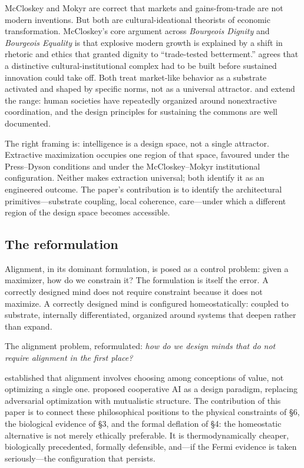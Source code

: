 \documentclass[11pt,twocolumn]{article}
\begin{document}
McCloskey and Mokyr are correct that markets and gains-from-trade are not
modern inventions. But both are cultural-ideational theorists of economic
transformation. McCloskey's core argument across \emph{Bourgeois Dignity}
\citep{McCloskey2010} and \emph{Bourgeois Equality} \citep{McCloskey2016}
is that explosive modern growth is explained by a shift in rhetoric and
ethics that granted dignity to ``trade-tested betterment.''
\citet{Mokyr2016} agrees that a distinctive cultural-institutional complex
had to be built before sustained innovation could take off. Both treat
market-like behavior as a substrate activated and shaped by specific
norms, not as a universal attractor. \citet{GraeberWengrow2021} and
\citet{Ostrom1990} extend the range: human societies have repeatedly
organized around nonextractive coordination, and the design principles
for sustaining the commons are well documented.

The right framing is: intelligence is a design space, not a single
attractor. Extractive maximization occupies one region of that space,
favoured under the Press--Dyson conditions and under the
McCloskey--Mokyr institutional configuration. Neither makes extraction
universal; both identify it as an engineered outcome. The paper's
contribution is to identify the architectural primitives—substrate
coupling, local coherence, care—under which a different region of the
design space becomes accessible.

\subsection{The reformulation}

Alignment, in its dominant formulation, is posed as a control problem:
given a maximizer, how do we constrain it? The formulation is itself the
error. A correctly designed mind does not require constraint because it
does not maximize. A correctly designed mind is configured homeostatically:
coupled to substrate, internally differentiated, organized around systems
that deepen rather than expand.

The alignment problem, reformulated: \emph{how do we design minds that do
not require alignment in the first place?}

\citet{Gabriel2020} established that alignment involves choosing among
conceptions of value, not optimizing a single one. \citet{Dafoe2021}
proposed cooperative AI as a design paradigm, replacing adversarial
optimization with mutualistic structure. The contribution of this paper
is to connect these philosophical positions to the physical constraints
of \S 6, the biological evidence of \S 3, and the formal deflation of
\S 4: the homeostatic alternative is not merely ethically preferable. It
is thermodynamically cheaper, biologically precedented, formally
defensible, and—if the Fermi evidence is taken seriously—the
configuration that persists.
\end{document}
